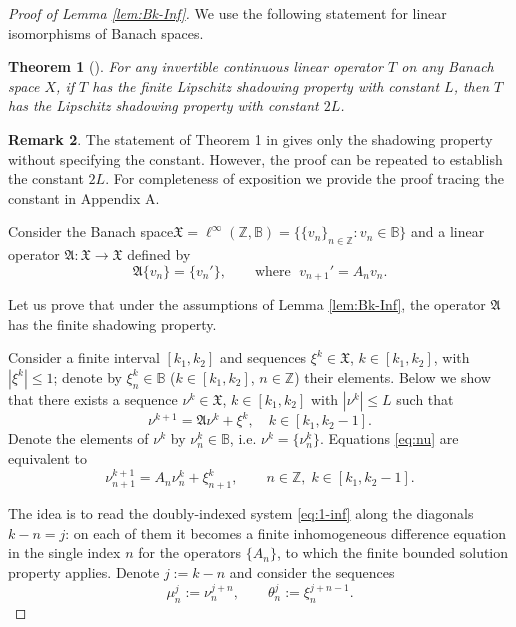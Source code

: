 \documentclass[12pt]{article}
\newcommand{\Bb}{\mathbb{B}}
\newcommand{\Zz}{\mathbb{Z}}
\newcommand{\Aop}{\mathfrak{A}}
\newcommand{\Xop}{\mathfrak{X}}
\newtheorem{thm}{Theorem}
\theoremstyle{definition}
\newtheorem{remark}[thm]{Remark}
\begin{document}
\begin{proof}[Proof of Lemma \ref{lem:Bk-Inf}]
We use the following statement for linear isomorphisms of Banach spaces.
\begin{thm}[{\cite[Theorem 1]{NilsonPeris}}]\label{thm:Bernandes-shadowing}
    For any invertible continuous linear operator $T$ on any Banach space $X$, if $T$ has the finite Lipschitz shadowing property with constant $L$, then $T$ has the Lipschitz shadowing property with constant $2L$.
\end{thm}
\begin{remark}
    The statement of Theorem 1 in \cite{NilsonPeris} gives only the shadowing property without specifying the constant. However, the proof can be repeated to establish the constant $2L$. For completeness of exposition we provide the proof tracing the constant in Appendix A.
\end{remark}

Consider the Banach space$
\Xop =\ell^{\infty}(\Zz, \Bb)=\bigl\{\{v_n\}_{n\in\Zz}: v_n\in \Bb \bigr\}
$
and a linear operator $\Aop \colon \Xop \to \Xop$ defined by
$$
\Aop\{v_n\}=\{v_n'\}, \qquad \text{where }\; v_{n+1}'=A_n v_n.
$$

Let us prove that under the assumptions of Lemma \ref{lem:Bk-Inf}, the operator $\Aop$ has the finite shadowing property. 

Consider a finite interval $[k_1, k_2]$ and sequences $\xi^k\in \Xop$, $k \in [k_1, k_2]$, with $|\xi^k|\leq1$; denote by $\xi_n^k \in \Bb$ ($k\in[k_1,k_2]$, $n\in\Zz$) their elements.
Below we show that there exists a sequence $\nu^k \in \Xop$, $k\in[k_1,k_2]$ with $|\nu^k| \leq L$ such that
\begin{equation}\label{eq:nu}
  \nu^{k+1}=\Aop\nu^k+\xi^k,\quad k \in [k_1, k_2-1].
\end{equation}
Denote the elements of $\nu^k$ by $\nu^k_n \in \Bb$, i.e. $\nu^k = \{\nu^k_n\}$.
Equations \eqref{eq:nu} are equivalent to
\begin{equation}\label{eq:1-inf}
  \nu_{n+1}^{k+1}=A_n \nu_n^k+\xi_{n+1}^k, \qquad n \in \Zz,\; k \in [k_1,k_2-1].
\end{equation}

The idea is to read the doubly-indexed system \eqref{eq:1-inf} along the diagonals $k-n=j$: on each of them it becomes a finite inhomogeneous difference equation in the single index $n$ for the operators $\{A_n\}$, to which the finite bounded solution property applies.
Denote $j := k-n$ and consider the sequences
\begin{equation}\label{eq:1.5}
  \mu_n^j := \nu_n^{j+n},\qquad \theta_n^j := \xi_n^{j+n-1}.
\end{equation}


\end{proof}
\end{document}
